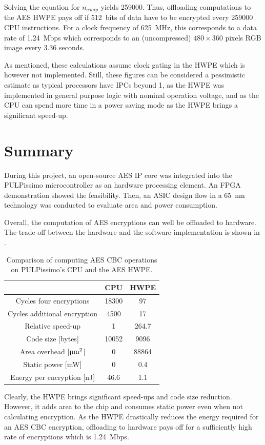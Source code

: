 \documentclass[a4paper, 12pt]{article}
\begin{document}
Solving the equation for $n_{comp}$ yields \num{259000}. Thus, offloading computations to the AES HWPE pays off if \SI{512}{bits} of data have to be encrypted every \num{259000} CPU instructions. For a clock frequency of \SI{625}{MHz}, this corresponds to a data rate of \SI{1.24}{Mbps} which corresponds to an (uncompressed) $480 \times 360$ pixels RGB image every $3.36$ seconds.

As mentioned, these calculations assume clock gating in the HWPE which is however not implemented. Still, these figures can be considered a pessimistic estimate as typical processors have IPCs beyond 1, as the HWPE was implemented in general purpose logic with nominal operation voltage, and as the CPU can spend more time in a power saving mode as the HWPE brings a significant speed-up.

\pagebreak
\section{Summary} \label{sec:summary}

During this project, an open-source AES IP core was integrated into the PULPissimo microcontroller as an hardware processing element. An FPGA demonstration showed the feasibility. Then, an ASIC design flow in a \SI{65}{nm} technology was conducted to evaluate area and power consumption.

Overall, the computation of AES encryptions can well be offloaded to hardware. The trade-off between the hardware and the software implementation is shown in .

\begin{table}[h]
    \centering
    \begin{tabular}{c|c c}
        \toprule
        & CPU & HWPE \\
        \midrule
		Cycles four encryptions & 18300 & 97 \\
		Cycles additional encryption & 4500 & 17 \\
		Relative speed-up & 1  & 264.7 \\
		Code size [bytes] & 10052 & 9096 \\
		Area overhead [$\textrm{\micro m}^2$] & 0 & 88864 \\
		Static power [mW] & 0 & 0.4 \\
		Energy per encryption [nJ] & 46.6 & 1.1 \\
        \bottomrule
    \end{tabular}
	\caption{Comparison of computing AES CBC operations on PULPissimo's CPU and the AES HWPE.}
	\label{tab:conclusion}
\end{table}

Clearly, the HWPE brings significant speed-ups and code size reduction. However, it adds area to the chip and consumes static power even when not calculating encryption. As the HWPE drastically reduces the energy required for an AES CBC encryption, offloading to hardware pays off for a sufficiently high rate of encryptions which is \SI{1.24}{Mbps}.

\clearpage
\sloppy
\printbibliography
\end{document}
